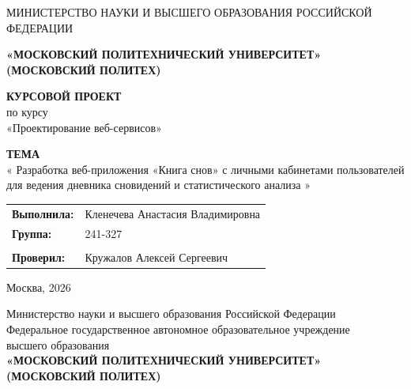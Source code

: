 \documentclass[14pt, a4paper]{extarticle}
\newcommand{\theme}{%
    Разработка веб-приложения «Книга снов» с личными кабинетами 
    пользователей для ведения дневника сновидений и статистического анализа%
}
\newcommand{\subject}{Проектирование веб-сервисов}
\newcommand{\student}{Кленечева Анастасия Владимировна}
\newcommand{\group}{241-327}
\newcommand{\teacher}{Кружалов Алексей Сергеевич}
\begin{document}
\thispagestyle{empty}

\begin{center}
    {\small МИНИСТЕРСТВО НАУКИ И ВЫСШЕГО ОБРАЗОВАНИЯ РОССИЙСКОЙ ФЕДЕРАЦИИ}
    
    
    {\small \textbf{«МОСКОВСКИЙ ПОЛИТЕХНИЧЕСКИЙ УНИВЕРСИТЕТ»}} \\
    {\small \textbf{(МОСКОВСКИЙ ПОЛИТЕХ)}}

    \vspace{4cm}

    {\Large \textbf{КУРСОВОЙ ПРОЕКТ}} \\[1cm]
    {\large по курсу \\ «\subject»}

    \vspace{1.5cm}

    \textbf{ТЕМА} \\[0.3cm]
    {\large «\theme»}

    \vspace{3cm}

    \hfill
    \begin{tabular}{p{3cm} l}
        \textbf{Выполнила:} & \student \\
        \textbf{Группа:}   & \group \\
        \\
        \textbf{Проверил:}  & \teacher
    \end{tabular}

    \vfill

    Москва, 2026

\end{center}

\newpage

\thispagestyle{empty}

\noindent
Министерство науки и высшего образования Российской Федерации\\
Федеральное государственное автономное образовательное учреждение\\
высшего образования\\[6pt]
\textbf{«МОСКОВСКИЙ ПОЛИТЕХНИЧЕСКИЙ УНИВЕРСИТЕТ»}\\
\textbf{(МОСКОВСКИЙ ПОЛИТЕХ)}\\[24pt]
\end{document}
